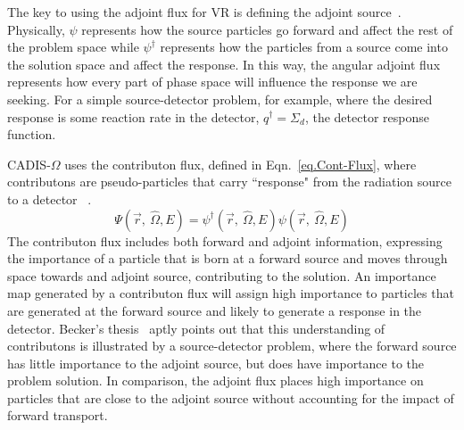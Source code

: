 \documentclass[12pt]{article}
\newcommand{\vOmega}{\ensuremath{\hat{\Omega}}}
\begin{document}
The key to using the adjoint flux for VR is defining the adjoint source~\cite{wagner_forward-weighted_2007}. 
Physically, $\psi$ represents how the source particles go forward and affect the rest of the problem space while $\psi^{\dagger}$ represents how the particles from a source come into the solution space and affect the response. 
In this way, the angular adjoint flux represents how every part of phase space will influence the response we are seeking.
For a simple source-detector problem, for example, where the desired response is some reaction rate in the detector, $q^\dagger = \Sigma _{ d }$, the detector response function. 

CADIS-$\Omega$ uses the contributon flux, defined in Eqn.~\eqref{eq.Cont-Flux}, where contributons are pseudo-particles that carry ``response" from the radiation source to a detector ~\cite{williams_generalized_1991,williams_contributorn_1992,williams_contributon_study}. 
%
\begin{equation}
\Psi (\vec {r},\:\hat\Omega ,E) = \psi^{\dagger} (\vec {r},\:\hat\Omega ,E) \psi(\vec {r} ,\:\hat\Omega,E)
\label{eq.Cont-Flux} 
\end{equation}
%
The contributon flux includes both forward and adjoint information, expressing the importance of a particle that is born at a forward source and moves through space towards and adjoint source, contributing to the solution.
An importance map generated by a contributon flux will assign high importance to particles that are generated at the forward source and likely to generate a response in the detector. 
Becker's thesis~\cite{becker_hybrid_2009} aptly points out that this understanding of contributons is illustrated by a source-detector problem, where the forward source has little importance to the adjoint source, but does have importance to the problem solution.
In comparison, the adjoint flux places high importance on particles that are close to the adjoint source without accounting for the impact of forward transport. 
\end{document}
